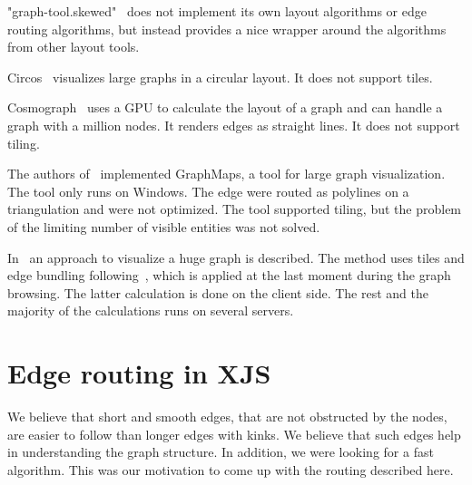 \documentclass{gd-llncs}
\begin{document}
"graph-tool.skewed"~\cite{skewed} does not implement its own layout algorithms or
edge routing algorithms, but instead provides a nice wrapper around the algorithms from
other layout tools.

Circos~\cite{circos} visualizes large graphs in a circular layout. It does not support tiles.


Cosmograph~\cite{cosmograph} uses a GPU to calculate the layout of a graph and can
handle a graph with a million nodes. It renders edges as straight lines.
It does not support tiling.

The authors of~\cite{nachmanson2015graphmaps} implemented GraphMaps, a tool for large graph visualization.
The tool only runs on Windows. The edge were routed as polylines on a triangulation and were not optimized.
The tool supported tiling, but the problem of the limiting number of visible entities was not solved.

In~\cite{perrot2018cornac} an approach to visualize a huge graph is described. The method uses tiles and
edge bundling following~\cite{hurter2012graph}, which is applied at the last moment during the graph browsing.
The latter calculation is done on the client side. The rest and the majority of the calculations runs on several servers.




\section*{Edge routing in XJS}
We believe that short and smooth edges, that are not obstructed by the nodes, are easier to follow than longer edges with kinks.
We believe that such edges help in understanding the graph structure.
In addition, we were looking for a fast algorithm.
This was our motivation to come up with the routing described here.
\end{document}
